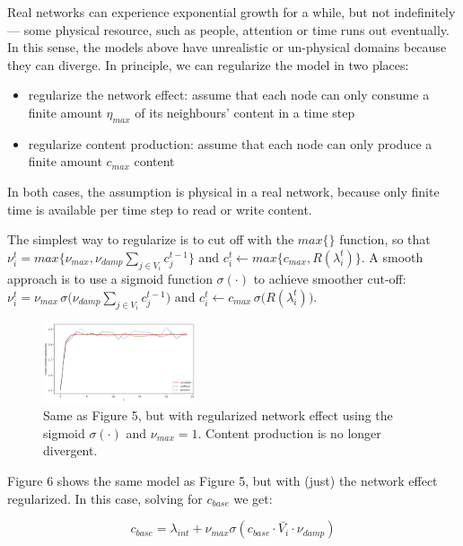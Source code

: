 \documentclass[final,5p,times,twocolumn,authoryear]{elsarticle}
\begin{document}
Real networks can experience exponential growth for a while, but not indefinitely --- some physical resource, such as people, attention or time runs out eventually. In this sense, the models above have unrealistic or un-physical domains because they can diverge. In principle, we can regularize the model in two places:

\begin{itemize}
\setlength\itemsep{0em}
    \item regularize the network effect: assume that each node can only consume a finite amount $\eta_{max}$ of its neighbours' content in a time step
    \item regularize content production: assume that each node can only produce a finite amount $c_{max}$ content
\end{itemize}

In both cases, the assumption is physical in a real network, because only finite time is available per time step to read or write content.

The simplest way to regularize is to cut off with the $max\{\}$ function, so that $\nu_i^t = max\{ \nu_{max}, \nu_{damp} \sum_{j \in V_i}{c_j^{t-1}} \}$ and $c_i^t \leftarrow max\{ c_{max}, R(\lambda_i^t) \}$. A smooth approach is to use a sigmoid function $\sigma(\cdot)$ to achieve smoother cut-off: $\nu_i^t = \nu_{max} \, \sigma \bigl( \nu_{damp} \sum_{j \in V_i}{c_j^{t-1}} \bigr) $ and $c_i^t \leftarrow c_{max} \, \sigma \bigl( R(\lambda_i^t) \bigr) $.

\begin{figure}[h]
	\centering 
	\includegraphics[width=0.4\textwidth]{figure-6.png}	
	\caption{Same as Figure 5, but with regularized network effect using the sigmoid $\sigma(\cdot)$ and $\nu_{max}=1$. Content production is no longer divergent.} 
\end{figure}

Figure 6 shows the same model as Figure 5, but with (just) the network effect regularized. In this case, solving for $c_{base}$ we get:

\begin{equation}
    c_{base} = \lambda_{int} + \nu_{max} \sigma( c_{base} \cdot \bar{V_i} \cdot \nu_{damp} )
\end{equation}
\end{document}
